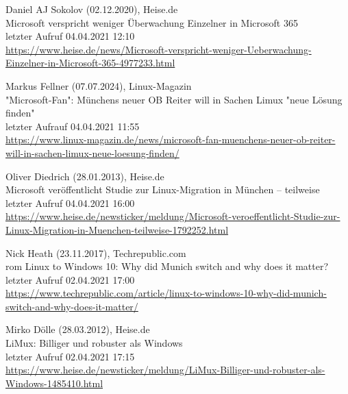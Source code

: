 \begin{thebibliography}{9}
    \bibitem{}
        Daniel AJ Sokolov (02.12.2020), Heise.de
        \\Microsoft verspricht weniger Überwachung Einzelner in Microsoft 365
        \\letzter Aufruf 04.04.2021 12:10
        \\\url{https://www.heise.de/news/Microsoft-verspricht-weniger-Ueberwachung-Einzelner-in-Microsoft-365-4977233.html}

    \bibitem{}
        Markus Fellner (07.07.2024), Linux-Magazin
        \\"Microsoft-Fan": Münchens neuer OB Reiter will in Sachen Limux "neue Lösung finden"
        \\letzter Aufrauf 04.04.2021 11:55
        \\\url{https://www.linux-magazin.de/news/microsoft-fan-muenchens-neuer-ob-reiter-will-in-sachen-limux-neue-loesung-finden/}

    \bibitem{}
        Oliver Diedrich (28.01.2013), Heise.de
        \\Microsoft veröffentlicht Studie zur Linux-Migration in München – teilweise
        \\letzter Aufruf 04.04.2021 16:00
        \\\url{https://www.heise.de/newsticker/meldung/Microsoft-veroeffentlicht-Studie-zur-Linux-Migration-in-Muenchen-teilweise-1792252.html}

    \bibitem{}
        Nick Heath (23.11.2017), Techrepublic.com
        \\rom Linux to Windows 10: Why did Munich switch and why does it matter?
        \\letzter Aufruf 02.04.2021 17:00
        \\\url{https://www.techrepublic.com/article/linux-to-windows-10-why-did-munich-switch-and-why-does-it-matter/}

    \bibitem{}
        Mirko Dölle (28.03.2012), Heise.de
        \\LiMux: Billiger und robuster als Windows
        \\letzter Aufruf 02.04.2021 17:15
        \\\url{https://www.heise.de/newsticker/meldung/LiMux-Billiger-und-robuster-als-Windows-1485410.html}

\end{thebibliography}